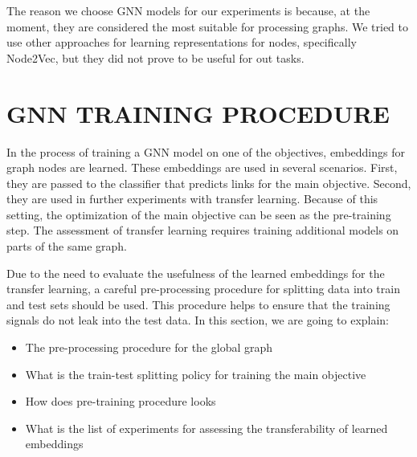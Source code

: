 \documentclass[a4paper,twoside]{article}
\begin{document}
The reason we choose GNN models for our experiments is because, at the moment, they are considered the most suitable for processing graphs. 
We tried to use other approaches for learning representations for nodes, specifically Node2Vec, but they did not prove to be useful for out tasks.





\section{\uppercase{GNN Training Procedure}}\label{sec:training}

In the process of training a GNN model on one of the objectives, embeddings for graph nodes are learned. These embeddings are used in several scenarios. First, they are passed to the classifier that predicts links for the main objective. Second, they are used in further experiments with transfer learning. Because of this setting, the optimization of the main objective can be seen as the pre-training step. The assessment of transfer learning requires training additional models on parts of the same graph.

Due to the need to evaluate the usefulness of the learned embeddings for the transfer learning, a careful pre-processing procedure for splitting data into train and test sets should be used. This procedure helps to ensure that the training signals do not leak into the test data. In this section, we are going to explain:
\begin{itemize}
    \item The pre-processing procedure for the global graph
    \item What is the train-test splitting policy for training the main objective
    \item How does pre-training procedure looks
    \item What is the list of experiments for assessing the transferability of learned embeddings
\end{itemize}
\end{document}
